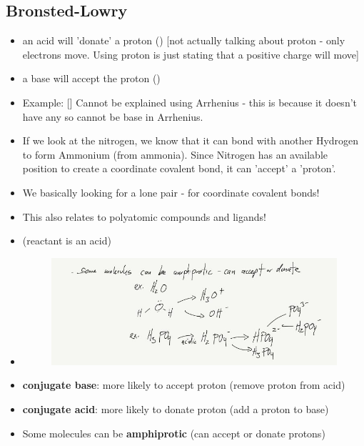 \documentclass{article}
\begin{document}
\subsection{Bronsted-Lowry}
\begin{itemize}
\item an acid will 'donate' a proton () [not actually talking about proton - only electrons move. Using proton is just stating that a positive charge will move] \item a base will accept the proton () \item Example: [] Cannot be explained using Arrhenius - this is because it doesn't have any  so cannot be base in Arrhenius. \item If we look at the nitrogen, we know that it can bond with another Hydrogen to form Ammonium (from ammonia). Since Nitrogen has an available position to create a coordinate covalent bond,  it can 'accept' a 'proton'.  \item We basically looking for a lone pair - for coordinate covalent bonds! \item This also relates to polyatomic compounds and ligands! \item {} (reactant is an acid) \item {} \begin{figure}[H]\includegraphics[width=\textwidth]{4.1fig1.jpg}\end{figure}
\item \textbf{conjugate base}: more likely to accept proton (remove proton from acid)  \item \textbf{conjugate acid}: more likely to donate proton (add a proton to base) \item Some molecules can be \textbf{amphiprotic} (can accept or donate protons)
\end{itemize}
\end{document}
